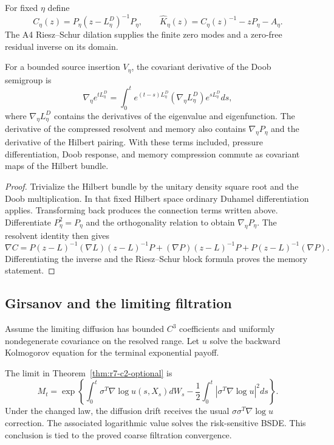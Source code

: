 For fixed $\eta$ define
\[
 C_\eta(z)=P_\eta(z-L_\eta^D)^{-1}P_\eta,
 \qquad
 \widehat K_\eta(z)=C_\eta(z)^{-1}-zP_\eta-A_\eta.
\]
The A4 Riesz--Schur dilation supplies the finite zero modes and a zero-free
residual inverse on its domain.

\begin{theorem}
\label{thm:r7-c2-memory}
For a bounded source insertion $V_\eta$, the covariant derivative of the Doob
semigroup is
\[
 \nabla_\eta e^{tL_\eta^D}
 =\int_0^t e^{(t-s)L_\eta^D}
  (\nabla_\eta L_\eta^D)e^{sL_\eta^D}ds,
\]
where $\nabla_\eta L_\eta^D$ contains the derivatives of the eigenvalue and
eigenfunction.  The derivative of the compressed resolvent and memory also
contains $\nabla_\eta P_\eta$ and the derivative of the Hilbert pairing.  With
these terms included, pressure differentiation, Doob response, and memory
compression commute as covariant maps of the Hilbert bundle.
\end{theorem}

\begin{proof}
Trivialize the Hilbert bundle by the unitary density square root and the Doob
multiplication.  In that fixed Hilbert space ordinary Duhamel differentiation
applies.  Transforming back produces the connection terms written above.
Differentiate $P_\eta^2=P_\eta$ and the orthogonality relation to obtain
$\nabla_\eta P_\eta$.  The resolvent identity then gives
\[
 \nabla C=P( z-L)^{-1}(\nabla L)(z-L)^{-1}P
 +(\nabla P)(z-L)^{-1}P+P(z-L)^{-1}(\nabla P).
\]
Differentiating the inverse and the Riesz--Schur block formula proves the
memory statement.
\end{proof}

\subsection{Girsanov and the limiting filtration}

Assume the limiting diffusion has bounded $C^3$ coefficients and uniformly
nondegenerate covariance on the resolved range.  Let $u$ solve the backward
Kolmogorov equation for the terminal exponential payoff.

\begin{theorem}
\label{thm:r7-c2-girsanov}
The limit in Theorem~\ref{thm:r7-c2-optional} is
\[
 M_t=\exp\left\{
 \int_0^t\sigma^T\nabla\log u(s,X_s)dW_s
 -\frac12\int_0^t|\sigma^T\nabla\log u|^2ds\right\}.
\]
Under the changed law, the diffusion drift receives the usual
$\sigma\sigma^T\nabla\log u$ correction.  The associated logarithmic value
solves the risk-sensitive BSDE.  This conclusion is tied to the proved coarse
filtration convergence.
\end{theorem}


